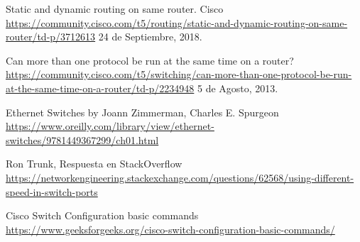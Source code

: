\begin{thebibliography}{9}
Static and dynamic routing on same router. Cisco \href{https://community.cisco.com/t5/routing/static-and-dynamic-routing-on-same-router/td-p/3712613}{https://community.cisco.com/t5/routing/static-and-dynamic-routing-on-same-router/td-p/3712613} 24 de Septiembre, 2018.


Can more than one protocol be run at the same time on a router? \href{https://community.cisco.com/t5/switching/can-more-than-one-protocol-be-run-at-the-same-time-on-a-router/td-p/2234948}{https://community.cisco.com/t5/switching/can-more-than-one-protocol-be-run-at-the-same-time-on-a-router/td-p/2234948} 5 de Agosto, 2013.

Ethernet Switches by Joann Zimmerman, Charles E. Spurgeon \href{https://www.oreilly.com/library/view/ethernet-switches/9781449367299/ch01.html}{https://www.oreilly.com/library/view/ethernet-switches/9781449367299/ch01.html}

Ron Trunk, Respuesta en StackOverflow \href{https://networkengineering.stackexchange.com/questions/62568/using-different-speed-in-switch-ports}{https://networkengineering.stackexchange.com/questions/62568/using-different-speed-in-switch-ports}

Cisco Switch Configuration basic commands \href{https://www.geeksforgeeks.org/cisco-switch-configuration-basic-commands/}{https://www.geeksforgeeks.org/cisco-switch-configuration-basic-commands/}


\end{thebibliography}
